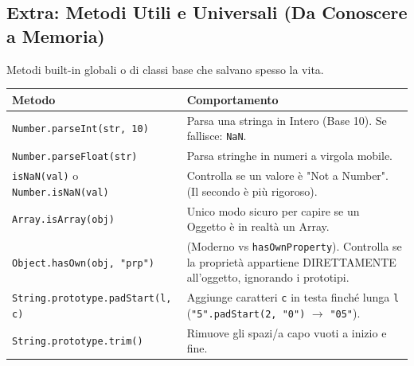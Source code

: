 \documentclass[a4paper,10pt]{article}
\begin{document}
\subsection{Extra: Metodi Utili e Universali (Da Conoscere a Memoria)}
Metodi built-in globali o di classi base che salvano spesso la vita.

\begin{center}
\renewcommand{\arraystretch}{1.5}
\begin{tabular}{|p{5.5cm}|p{8cm}|}
\hline
\textbf{Metodo} & \textbf{Comportamento} \\
\hline
\texttt{Number.parseInt(str, 10)} & Parsa una stringa in Intero (Base 10). Se fallisce: \texttt{NaN}. \\
\hline
\texttt{Number.parseFloat(str)} & Parsa stringhe in numeri a virgola mobile. \\
\hline
\texttt{isNaN(val)} o \texttt{Number.isNaN(val)} & Controlla se un valore è "Not a Number". (Il secondo è più rigoroso). \\
\hline
\texttt{Array.isArray(obj)} & Unico modo sicuro per capire se un Oggetto è in realtà un Array. \\
\hline
\texttt{Object.hasOwn(obj, "prp")} & (Moderno vs \texttt{hasOwnProperty}). Controlla se la proprietà appartiene DIRETTAMENTE all'oggetto, ignorando i prototipi. \\
\hline
\texttt{String.prototype.padStart(l, c)} & Aggiunge caratteri \texttt{c} in testa finché lunga \texttt{l} (\texttt{"5".padStart(2, "0")} $\to$ \texttt{"05"}). \\
\hline
\texttt{String.prototype.trim()} & Rimuove gli spazi/a capo vuoti a inizio e fine. \\
\hline
\end{tabular}
\end{center}

\end{document}
